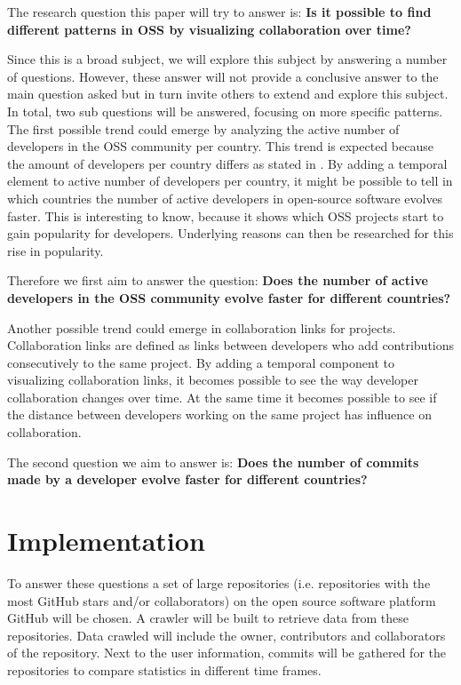 \documentclass[acmtog, authorversion]{acmart}
\begin{document}
The research question this paper will try to answer is: \textbf{Is it possible to find different patterns in OSS by visualizing collaboration over time?}

Since this is a broad subject, we will explore this subject by answering a number of questions. 
However, these answer will not provide a conclusive answer to the main question asked but in turn invite others to extend and explore this subject.
In total, two sub questions will be answered, focusing on more specific patterns.
The first possible trend could emerge by analyzing the active number of developers in the OSS community per country. 
This trend is expected because the amount of developers per country differs as stated in \cite{StackOverflow2017}.
By adding a temporal element to active number of developers per country, it might be possible to tell in which countries the number of active developers in open-source software evolves faster. 
This is interesting to know, because it shows which OSS projects start to gain popularity for developers. 
Underlying reasons can then be researched for this rise in popularity.

Therefore we first aim to answer the question: \textbf{Does the number of active developers in the OSS community evolve faster for different countries?}

Another possible trend could emerge in collaboration links for projects.
Collaboration links are defined as links between developers who add contributions consecutively to the same project.
By adding a temporal component to visualizing collaboration links, it becomes possible to see the way developer collaboration changes over time.
At the same time it becomes possible to see if the distance between developers working on the same project has influence on collaboration.

The second question we aim to answer is: \textbf{Does the number of commits made by a developer evolve faster for different countries?}

\section{Implementation}
To answer these questions a set of large repositories (i.e. repositories with the most GitHub stars and/or collaborators) on the open source software platform GitHub will be chosen.
A crawler will be built to retrieve data from these repositories.
Data crawled will include the owner, contributors and collaborators of the repository.
Next to the user information, commits will be gathered for the repositories to compare statistics in different time frames.
\end{document}

